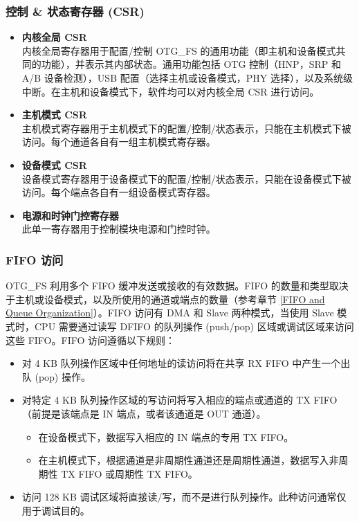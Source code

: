 \documentclass[main\_\_CN.tex]{subfiles}
\begin{document}
\subsubsection{控制 \& 状态寄存器 (CSR)}

\begin{itemize}
    \item {\bfseries 内核全局 CSR}\\
    内核全局寄存器用于配置/控制 OTG\_FS 的通用功能（即主机和设备模式共同的功能），并表示其内部状态。通用功能包括 OTG 控制（HNP，SRP 和 A/B 设备检测），USB 配置（选择主机或设备模式，PHY 选择），以及系统级中断。在主机和设备模式下，软件均可以对内核全局 CSR 进行访问。

    \item {\bfseries 主机模式 CSR}\\
    主机模式寄存器用于主机模式下的配置/控制/状态表示，只能在主机模式下被访问。每个通道各自有一组主机模式寄存器。

    \item {\bfseries 设备模式 CSR}\\
    设备模式寄存器用于设备模式下的配置/控制/状态表示，只能在设备模式下被访问。每个端点各自有一组设备模式寄存器。

    \item {\bfseries 电源和时钟门控寄存器}\\
    此单一寄存器用于控制模块电源和门控时钟。
\end{itemize}

\subsubsection{FIFO 访问}

OTG\_FS 利用多个 FIFO 缓冲发送或接收的有效数据。FIFO 的数量和类型取决于主机或设备模式，以及所使用的通道或端点的数量（参考章节 \ref{FIFO and Queue Organization}）。FIFO 访问有 DMA 和 Slave 两种模式，当使用 Slave 模式时，CPU 需要通过读写 DFIFO 的队列操作 (push/pop) 区域或调试区域来访问这些 FIFO。FIFO 访问遵循以下规则：

\begin{itemize}
\item 对 4 KB 队列操作区域中任何地址的读访问将在共享 RX FIFO 中产生一个出队 (pop) 操作。
\item 对特定 4 KB 队列操作区域的写访问将写入相应的端点或通道的 TX FIFO（前提是该端点是 IN 端点，或者该通道是 OUT 通道）。
\begin{itemize}
\item 在设备模式下，数据写入相应的 IN 端点的专用 TX FIFO。
\item 在主机模式下，根据通道是非周期性通道还是周期性通道，数据写入非周期性 TX FIFO 或周期性 TX FIFO。
\end{itemize}
\item 访问 128 KB 调试区域将直接读/写，而不是进行队列操作。此种访问通常仅用于调试目的。
\end{itemize}
\end{document}
